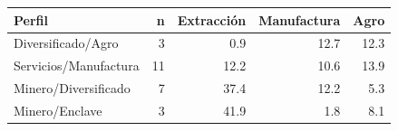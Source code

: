 \begin{tabular}{lrrrr}
\toprule
Perfil & n & Extracción & Manufactura & Agro \\
\midrule
Diversificado/Agro & 3 & 0.9 & 12.7 & 12.3 \\
Servicios/Manufactura & 11 & 12.2 & 10.6 & 13.9 \\
Minero/Diversificado & 7 & 37.4 & 12.2 & 5.3 \\
Minero/Enclave & 3 & 41.9 & 1.8 & 8.1 \\
\bottomrule
\end{tabular}
